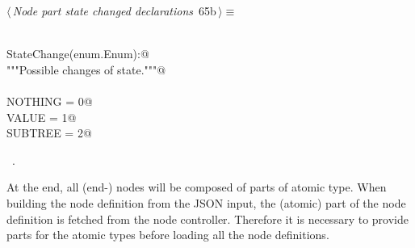 \documentclass[
    a4paper,      %
    10pt,         %
    openright,    %
    notitlepage,  %
    parskip=half, %
]{scrreprt}       %
\theoremstyle{definition}                    %
\begin{document}
\begin{flushleft} \small
\begin{minipage}{\linewidth}\label{scrap109}\raggedright\small
{} $\langle\,${\itshape Node part state changed declarations}\nobreak\ {\footnotesize {65b}}$\,\rangle\equiv$
\vspace{-1exm}
\begin{list}{}{} \item
\mbox{}\lstinline@@\\
\mbox{}\lstinline@class StateChange(enum.Enum):@\\
\mbox{}\lstinline@    """Possible changes of state."""@\\
\mbox{}\lstinline@@\\
\mbox{}\lstinline@    NOTHING  = 0@\\
\mbox{}\lstinline@    VALUE    = 1@\\
\mbox{}\lstinline@    SUBTREE  = 2@{\NWsep}
\end{list}
\vspace{-1.5ex}
\footnotesize
\begin{list}{}{\setlength{\itemsep}{-\parsep}\setlength{\itemindent}{-\leftmargin}}
\item \NWtxtMacroRefIn\ .

\item{}
\end{list}
\end{minipage}\vspace{4ex}
\end{flushleft}
At the end, all (end-) nodes will be composed of parts of atomic type.
When building the node definition from the JSON input, the (atomic) part of the
node definition is fetched from the node controller. Therefore it is necessary
to provide parts for the atomic types before loading all the node definitions.
\end{document}
